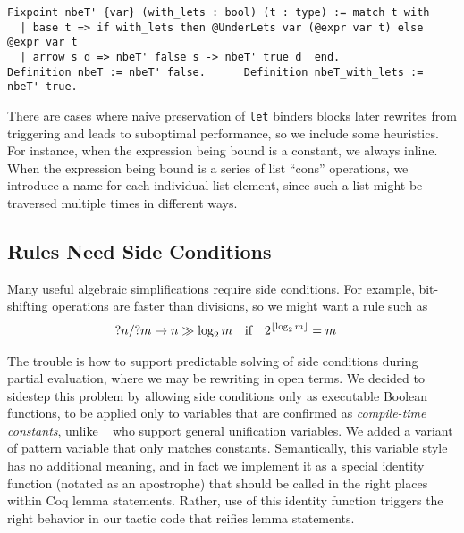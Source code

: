 \documentclass[a4paper,USenglish,cleveref,autoref,thm-restate]{lipics-v2021}
\newcommand{\citet}[1]{\usebibentry{#1}{citet}~\cite{#1}}
\begin{document}
\begin{verbatim}
Fixpoint nbeT' {var} (with_lets : bool) (t : type) := match t with
  | base t => if with_lets then @UnderLets var (@expr var t) else @expr var t
  | arrow s d => nbeT' false s -> nbeT' true d  end.
Definition nbeT := nbeT' false.      Definition nbeT_with_lets := nbeT' true.
\end{verbatim}


There are cases where naive preservation of \texttt{let} binders blocks later rewrites from triggering and leads to suboptimal performance, so we include some heuristics.
For instance, when the expression being bound is a constant, we always inline.
When the expression being bound is a series of list ``cons'' operations, we introduce a name for each individual list element, since such a list might be traversed multiple times in different ways.

\subsection{Rules Need Side Conditions}\label{sec:side-conditions}

Many useful algebraic simplifications require side conditions.
For example, bit-shifting operations are faster than divisions, so we might want a rule such as
\begin{align*}
  {?n} / {?m} & \to n \gg \log_2 m\text{\quad if\quad }2^{\lfloor \log_2 m \rfloor} = m
\end{align*}

The trouble is how to support predictable solving of side conditions during partial evaluation, where we may be rewriting in open terms.
We decided to sidestep this problem by allowing side conditions only as executable Boolean functions, to be applied only to variables that are confirmed as \emph{compile-time constants}, unlike \citet{rtac} who support general unification variables.
We added a variant of pattern variable that only matches constants.
Semantically, this variable style has no additional meaning, and in fact we implement it as a special identity function (notated as an apostrophe) that should be called in the right places within Coq lemma statements.
Rather, use of this identity function triggers the right behavior in our tactic code that reifies lemma statements.
\label{sec:explain-'}
\end{document}
